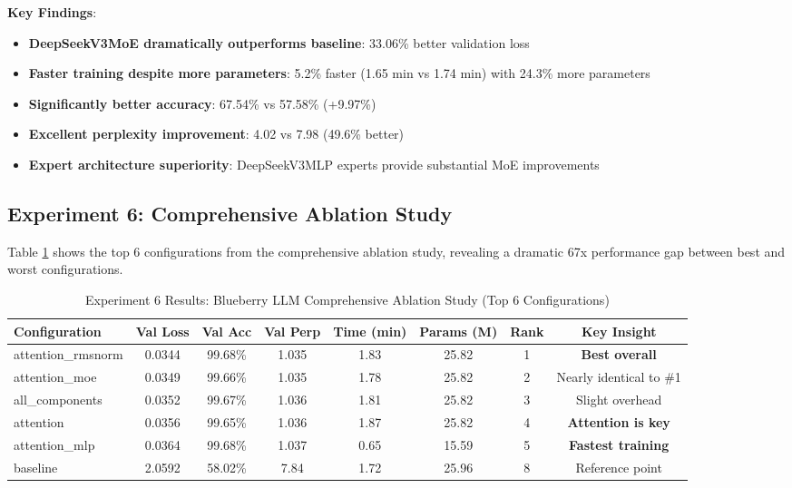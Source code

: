 \documentclass[11pt,a4paper]{article}
\begin{document}
\textbf{Key Findings}:
\begin{itemize}
    \item \textbf{DeepSeekV3MoE dramatically outperforms baseline}: 33.06\% better validation loss
    \item \textbf{Faster training despite more parameters}: 5.2\% faster (1.65 min vs 1.74 min) with 24.3\% more parameters
    \item \textbf{Significantly better accuracy}: 67.54\% vs 57.58\% (+9.97\%)
    \item \textbf{Excellent perplexity improvement}: 4.02 vs 7.98 (49.6\% better)
    \item \textbf{Expert architecture superiority}: DeepSeekV3MLP experts provide substantial MoE improvements
\end{itemize}

\subsection{Experiment 6: Comprehensive Ablation Study}

Table \ref{tab:exp6_results} shows the top 6 configurations from the comprehensive ablation study, revealing a dramatic 67x performance gap between best and worst configurations.

\begin{table}[H]
\centering
\caption{Experiment 6 Results: Blueberry LLM Comprehensive Ablation Study (Top 6 Configurations)}
\label{tab:exp6_results}
\begin{tabular}{@{}lccccccc@{}}
\toprule
Configuration & Val Loss & Val Acc & Val Perp & Time (min) & Params (M) & Rank & Key Insight \\
\midrule
attention\_rmsnorm & 0.0344 & 99.68\% & 1.035 & 1.83 & 25.82 & 1 & \textbf{Best overall} \\
attention\_moe & 0.0349 & 99.66\% & 1.035 & 1.78 & 25.82 & 2 & Nearly identical to \#1 \\
all\_components & 0.0352 & 99.67\% & 1.036 & 1.81 & 25.82 & 3 & Slight overhead \\
attention & 0.0356 & 99.65\% & 1.036 & 1.87 & 25.82 & 4 & \textbf{Attention is key} \\
attention\_mlp & 0.0364 & 99.68\% & 1.037 & 0.65 & 15.59 & 5 & \textbf{Fastest training} \\
baseline & 2.0592 & 58.02\% & 7.84 & 1.72 & 25.96 & 8 & Reference point \\
\bottomrule
\end{tabular}
\end{table}
\end{document}
